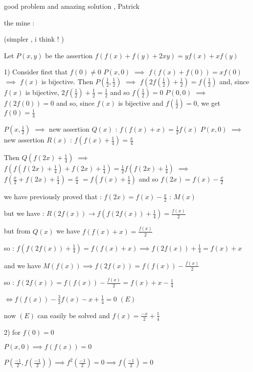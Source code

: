 \begin{solution}
	good problem and amazing solution , Patrick   

\begin{bolded}the mine :\end{bolded} (simpler , i think ! )

\begin{tcolorbox}
Let $ P(x,y)$ be the assertion $ f(f(x) + f(y) + 2xy) = yf(x) + xf(y)$


1) Consider first that $ f(0)\neq 0$
$ P(x,0)$ $ \implies$ $ f(f(x) + f(0)) = xf(0)$ $ \implies$ $ f(x)$ is bijective.
Then $ P(\frac 12,\frac 12)$ $ \implies$ $ f(2f(\frac 12) + \frac 12) = f(\frac 12)$ and, since $ f(x)$ is bijective, $ 2f(\frac 12) + \frac 12 = \frac 12$ and so $ f(\frac 12) = 0$
$ P(0,0)$ $ \implies$ $ f(2f(0)) = 0$ and so, since $ f(x)$ is bijective and $ f(\frac 12) = 0$, we get $ f(0) = \frac 14$

$ P(x,\frac 12)$ $ \implies$ new assertion $ Q(x)$ : $ f(f(x) + x) = \frac 12f(x)$
$ P(x,0)$ $ \implies$ new assertion $ R(x)$ : $ f(f(x) + \frac 14) = \frac x4$

Then $ Q(f(2x) + \frac 14)$ $ \implies$ $ f(f(f(2x) + \frac 14) + f(2x) + \frac 14) = \frac 12f(f(2x) + \frac 14)$ $ \implies$ $ f(\frac x2 + f(2x) + \frac 14) = \frac x4$ $ = f(f(x) + \frac 14)$ and so $ f(2x) = f(x) - \frac x2$
\end{tcolorbox}

we have previously proved that : $ \boxed{f(2x)=f(x)-\frac{x}{2}}$ : $ M(x)$

but we have : $ R(2f(x))\rightarrow f(f(2f(x))+\frac 14)=\frac{f(x)}{2}$

but from $ Q(x)$ we have $ f(f(x)+x)=\frac{f(x)}{2}$

so : $ f(f(2f(x))+\frac 14)=f(f(x)+x)\implies f(2f(x))+\frac 14=f(x)+x$

and we have $ M(f(x))\implies f(2f(x))=f(f(x))-\frac{f(x)}{2}$

so : $ f(2f(x))=f(f(x))-\frac{f(x)}{2}=f(x)+x-\frac 14$

$ \iff \boxed{f(f(x))-\frac{3}{2}f(x)-x+\frac 14=0}$  $ (E)$

now $ (E)$ can easily be solved  and $ f(x)=\frac{-x}{2}+\frac{1}{4}$

2) for $ f(0)=0$ 

$ P(x,0)\implies f(f(x))=0$

$ P(\frac{-1}{2},f(\frac{-1}{2}))\implies f^2(\frac{-1}{2})=0 \implies f(\frac{-1}{2})=0$


\end{solution}
